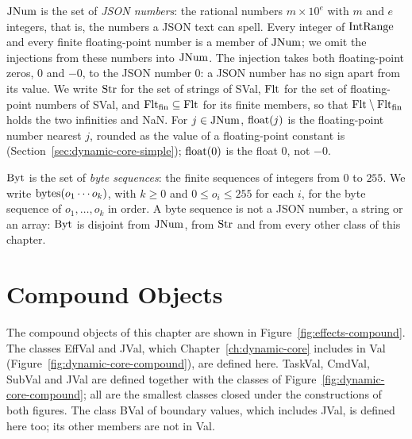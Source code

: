 $\mathrm{JNum}$ is the set of \emph{JSON numbers}: the rational numbers
$m\times 10^{e}$ with $m$ and $e$ integers, that is, the numbers a JSON text
can spell. Every integer of $\mathrm{IntRange}$ and every finite floating-point number
is a member of $\mathrm{JNum}$; we omit the injections from these numbers into
$\mathrm{JNum}$. The injection takes both floating-point zeros, $0$ and $-0$, to the JSON
number $0$: a JSON number has no sign apart from its value. %
We write $\mathrm{Str}$ for the set of strings of SVal, $\mathrm{Flt}$ for the set of
floating-point numbers of SVal, and $\mathrm{Flt}_{\mathrm{fin}}\subseteq\mathrm{Flt}$ for its finite
members, so that $\mathrm{Flt}\setminus\mathrm{Flt}_{\mathrm{fin}}$ holds the two infinities and
NaN. For $j\in\mathrm{JNum}$, $\mathrm{float}(j)$ is the floating-point number nearest
$j$, rounded as the value of a floating-point constant is
(Section~\ref{sec:dynamic-core-simple}); $\mathrm{float}(0)$ is the float $0$, not
$-0$. %

$\mathrm{Byt}$ is the set of \emph{byte sequences}: the finite sequences of
integers from $0$ to $255$. We write $\mathrm{bytes}(o_1\cdots o_k)$, with $k\geq 0$
and $0\leq o_i\leq 255$ for each $i$, for the byte sequence of
$o_1,\ldots,o_k$ in order. A byte sequence is not a JSON number, a string or an
array: $\mathrm{Byt}$ is disjoint from $\mathrm{JNum}$, from $\mathrm{Str}$ and from every
other class of this chapter. %

\section{Compound Objects}\label{sec:effects-compound}

The compound objects of this chapter are shown in
Figure~\ref{fig:effects-compound}. The classes EffVal and JVal, which
Chapter~\ref{ch:dynamic-core} includes in Val
(Figure~\ref{fig:dynamic-core-compound}), are defined here. TaskVal, CmdVal,
SubVal and JVal are defined together with the classes of
Figure~\ref{fig:dynamic-core-compound}; all are the smallest classes closed
under the constructions of both figures. The class BVal of boundary values,
which includes JVal, is defined here too; its other members are not in
Val. %

